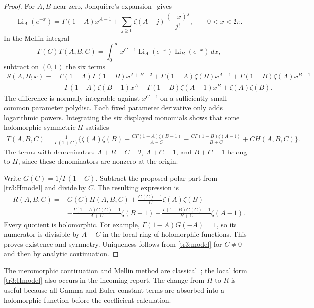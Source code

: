 \begin{proof}
For $A,B$ near zero, Jonqui\`ere's expansion~\cite[\S25.12(ii)]{tr3:DLMF} gives
\[
 \operatorname{Li}_A(e^{-x})
 =\Gamma(1-A)x^{A-1}
   +\sum_{j\geq0}\zeta(A-j)\frac{(-x)^j}{j!},\qquad 0<x<2\pi.
\]
In the Mellin integral
\[
 \Gamma(C)T(A,B,C)=\int_0^\infty
 x^{C-1}\operatorname{Li}_A(e^{-x})\operatorname{Li}_B(e^{-x})\,dx,
\]
subtract on $(0,1)$ the six terms
\begin{align*}
 S(A,B;x)={}&\Gamma(1-A)\Gamma(1-B)x^{A+B-2}
 +\Gamma(1-A)\zeta(B)x^{A-1}
 +\Gamma(1-B)\zeta(A)x^{B-1}\\
 &-\Gamma(1-A)\zeta(B-1)x^A
 -\Gamma(1-B)\zeta(A-1)x^B+\zeta(A)\zeta(B).
\end{align*}
The difference is normally integrable against $x^{C-1}$ on a sufficiently
small common parameter polydisc.  Each fixed parameter derivative only
adds logarithmic powers.  Integrating the six displayed monomials shows
that some holomorphic symmetric $H$ satisfies
\begin{align}\label{tr3:Hmodel}
 T(A,B,C)=\frac{1}{\Gamma(1+C)}\biggl\{
 \zeta(A)\zeta(B)
 -\frac{C\Gamma(1-A)\zeta(B-1)}{A+C}
 -\frac{C\Gamma(1-B)\zeta(A-1)}{B+C}+C H(A,B,C)\biggr\}.
\end{align}
The terms with denominators $A+B+C-2$, $A+C-1$, and $B+C-1$ belong
to $H$, since these denominators are nonzero at the origin.

Write $G(C)=1/\Gamma(1+C)$.  Subtract the proposed polar part from
\eqref{tr3:Hmodel} and divide by $C$.  The resulting expression is
\begin{align*}
 R(A,B,C)={}&G(C)H(A,B,C)
  +\frac{G(C)-1}{C}\zeta(A)\zeta(B)\\
 &-\frac{\Gamma(1-A)G(C)-1}{A+C}\zeta(B-1)
  -\frac{\Gamma(1-B)G(C)-1}{B+C}\zeta(A-1).
\end{align*}
Every quotient is holomorphic.  For example,
$\Gamma(1-A)G(-A)=1$, so its numerator is divisible by $A+C$ in
the local ring of holomorphic functions.  This proves existence and
symmetry.  Uniqueness follows from \eqref{tr3:model} for $C\ne0$ and
then by analytic continuation.
\end{proof}

The meromorphic continuation and Mellin method are classical~\cite{tr3:BD,tr3:SS}; the local
form \eqref{tr3:Hmodel} also occurs in the incoming report.  The change
from $H$ to $R$ is useful because all Gamma and Euler constant terms
are absorbed into a holomorphic function before the coefficient
calculation.

